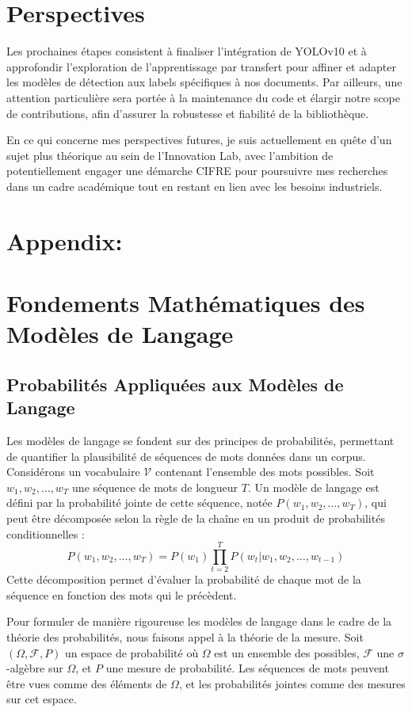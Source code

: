 \documentclass[13pt,a4paper]{article}
\begin{document}
\section{Perspectives}
Les prochaines étapes consistent à finaliser l'intégration de YOLOv10 et à approfondir l'exploration de l'apprentissage par transfert pour affiner et adapter les modèles de détection aux labels spécifiques à nos documents. Par ailleurs, une attention particulière sera portée à la maintenance du code et élargir notre scope de contributions, afin d'assurer la robustesse et fiabilité de la bibliothèque.

En ce qui concerne mes perspectives futures, je suis actuellement en quête d'un sujet plus théorique au sein de l'Innovation Lab, avec l'ambition de potentiellement engager une démarche CIFRE pour poursuivre mes recherches dans un cadre académique tout en restant en lien avec les besoins industriels.






\newpage
\section{ \Large \bf Appendix:}
\appendix
\section{Fondements Mathématiques des Modèles de Langage}

\subsection{Probabilités Appliquées aux Modèles de Langage}

Les modèles de langage se fondent sur des principes de probabilités, permettant de quantifier la plausibilité de séquences de mots données dans un corpus. Considérons un vocabulaire $\mathcal{V}$ contenant l'ensemble des mots possibles. Soit $w_1, w_2, \dots, w_T$ une séquence de mots de longueur $T$. Un modèle de langage est défini par la probabilité jointe de cette séquence, notée $P(w_1, w_2, \dots, w_T)$, qui peut être décomposée selon la règle de la chaîne en un produit de probabilités conditionnelles :
\[
P(w_1, w_2, \dots, w_T) = P(w_1) \prod_{t=2}^{T} P(w_t | w_1, w_2, \dots, w_{t-1})
\]
Cette décomposition permet d'évaluer la probabilité de chaque mot de la séquence en fonction des mots qui le précèdent. 

Pour formuler de manière rigoureuse les modèles de langage dans le cadre de la théorie des probabilités, nous faisons appel à la théorie de la mesure. Soit $(\Omega, \mathcal{F}, P)$ un espace de probabilité où $\Omega$ est un ensemble des possibles, $\mathcal{F}$ une $\sigma$-algèbre sur $\Omega$, et $P$ une mesure de probabilité. Les séquences de mots peuvent être vues comme des éléments de $\Omega$, et les probabilités jointes comme des mesures sur cet espace.
\end{document}
